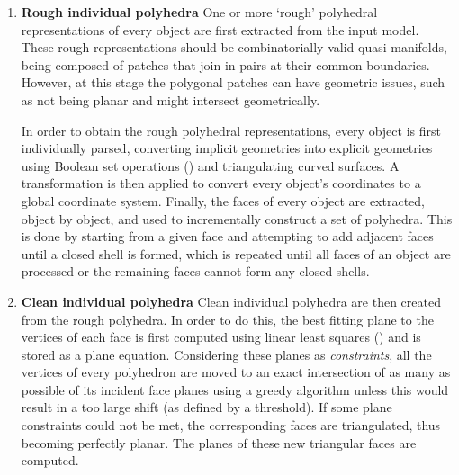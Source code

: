 \begin{enumerate}
\item
\textbf{Rough individual polyhedra}
One or more `rough' polyhedral representations of every object are first extracted from the input model.
These rough representations should be combinatorially valid quasi-manifolds, being composed of patches that join in pairs at their common boundaries.
However, at this stage the polygonal patches can have geometric issues, such as not being planar and might intersect geometrically.

In order to obtain the rough polyhedral representations, every object is first individually parsed, converting implicit geometries into explicit geometries using Boolean set operations () and triangulating curved surfaces.
A transformation is then applied to convert every object's coordinates to a global coordinate system.
Finally, the faces of every object are extracted, object by object, and used to incrementally construct a set of polyhedra.
This is done by starting from a given face and attempting to add adjacent faces until a closed shell is formed, which is repeated until all faces of an object are processed or the remaining faces cannot form any closed shells.

\item
\textbf{Clean individual polyhedra}
Clean individual polyhedra are then created from the rough polyhedra.
In order to do this, the best fitting plane to the vertices of each face is first computed using linear least squares () and is stored as a plane equation.
Considering these planes as \emph{constraints}, all the vertices of every polyhedron are moved to an exact intersection of as many as possible of its incident face planes using a greedy algorithm unless this would result in a too large shift (as defined by a threshold).
If some plane constraints could not be met, the corresponding faces are triangulated, thus becoming perfectly planar.
The planes of these new triangular faces are computed.


\end{enumerate}
